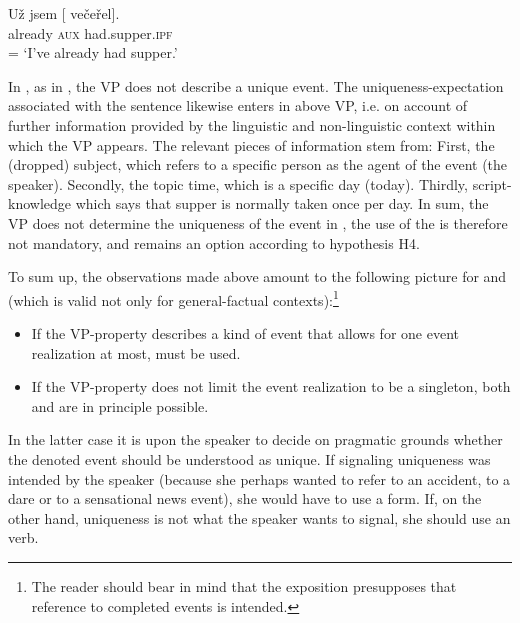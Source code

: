 \documentclass[output=paper,modfonts,newtxmath,hidelinks]{langscibook}
\begin{document}
\begin{exe}
\ex\label{13:dinner}
\gll U\v{z} jsem [ ve\v{c}e\v{r}el].\\
already \textsc{aux} {} had.supper.\textsc{ipf} \\\hfill = 
\glt `I've already had supper.'
\end{exe}



\noindent In , as in , the VP does not describe a unique event.  
The uniqueness-expectation associated with the sentence likewise enters in above VP, i.e. on account of further information provided by the linguistic and non-linguistic context within which
the VP appears. The relevant pieces of information stem from: First, the (dropped) subject, which refers to a specific person as the agent of the event (the speaker). 
Secondly, the topic time, which is a specific day (today). Thirdly, script-knowledge which says that supper is normally taken once per day.    
In sum, the VP does not determine the uniqueness of the event in , the use of the  is therefore not mandatory, and  remains an option according to hypothesis H4. 

To sum up, the observations made above amount to the following picture for  and  (which is valid not only for general-factual contexts):\footnote{The reader should bear in mind that the exposition presupposes that reference to completed events is intended.}

\begin{itemize}
 \item If the VP-property describes a kind of event that allows for one event realization at most,  must be used. 
\item If the VP-property does not limit the event realization to be a singleton, 
both  and  are in principle possible. 
\end{itemize}

\noindent In the latter case it is upon the speaker to decide on pragmatic grounds whether the denoted event should be 
understood as unique. If signaling uniqueness was intended by the speaker (because she perhaps wanted to refer to an accident, to a dare or to a sensational news event),
she would have to use a  form. 
If, on the other hand, uniqueness is not what the speaker wants to signal, she should use an  verb. 
\end{document}
